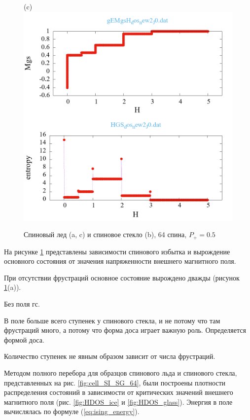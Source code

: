 \documentclass[utf8, babel, sor, jor, amsmath, amssymb, reprint]{elsarticle} %
\begin{document}
\begin{figure}[H]
\begin{minipage}[h]{0.32\linewidth}
	\end{minipage}
	\hfill
	\begin{minipage}[h]{0.32\linewidth}
		\centering(c)
		\includegraphics[width=1\linewidth]{pictures/_multiplot_SI64_J0}
	\end{minipage}
	
	\caption{Спиновый лед (a, c) и спиновое стекло (b), 64 спина, $P_+ = 0.5$}
	\label{fig:_multiplot_SI_SG_64}
	
\end{figure}


На рисунке \ref{fig:_multiplot_SI_SG_64} представлены зависимости спинового избытка и вырождение основного состояния от значения напряженности внешнего магнитного поля. 

При отсутствии фрустраций основное состояние вырождено дважды (рисунок \ref{fig:_multiplot_SI_SG_64}(a)). 

Без поля гс.

В поле больше всего ступенек у спинового стекла, и не потому что там фрустраций много, а потому что форма доса играет важную роль. Определяется формой доса.

Количество ступенек не явным образом зависит от числа фрустраций.


Методом полного перебора для образцов спинового льда и спинового стекла, представленных на рис. \ref{fig:cell_SI_SG_64}, были построены плотности распределения состояний в зависимости от критических значений внешнего магнитного поля (рис. \ref{fig:HDOS_ice} и \ref{fig:HDOS_glass}).
Энергия в поле вычислялась по формуле (\ref{eq:ising_energy}).
\end{document}
